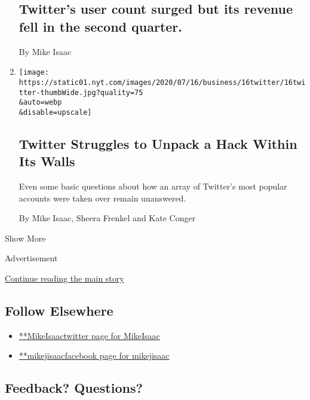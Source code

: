 \begin{enumerate}
  \hypertarget{twitters-user-count-surged-but-its-revenue-fell-in-the-second-quarter}{%
  \subsection{Twitter's user count surged but its revenue fell in the
  second
  quarter.}\label{twitters-user-count-surged-but-its-revenue-fell-in-the-second-quarter}}

  By Mike Isaac
\item
  \href{/2020/07/16/technology/twitter-hack-investigation.html}{}

  \texttt{[image: https://static01.nyt.com/images/2020/07/16/business/16twitter/16twitter-thumbWide.jpg?quality=75\\\&auto=webp\\\&disable=upscale]}

  \hypertarget{twitter-struggles-to-unpack-a-hack-within-its-walls}{%
  \subsection{Twitter Struggles to Unpack a Hack Within Its
  Walls}\label{twitter-struggles-to-unpack-a-hack-within-its-walls}}

  Even some basic questions about how an array of Twitter's most popular
  accounts were taken over remain unanswered.

  By Mike Isaac, Sheera Frenkel and Kate Conger
\end{enumerate}

Show More

Advertisement

\protect\hyperlink{after-mid2}{Continue reading the main story}

\hypertarget{follow-elsewhere}{%
\subsection{Follow Elsewhere}\label{follow-elsewhere}}

\begin{itemize}
\tightlist
\item
  \href{https://twitter.com/MikeIsaac}{**MikeIsaactwitter page for
  MikeIsaac}
\item
  \href{https://www.facebook.com/mikejisaac}{**mikejisaacfacebook page
  for mikejisaac}
\end{itemize}

\hypertarget{feedback-questions}{%
\subsection{Feedback? Questions?}\label{feedback-questions}}

